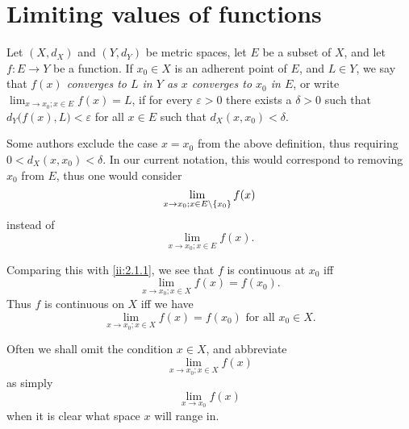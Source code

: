 \section{Limiting values of functions}\label{ii:sec:3.1}

\begin{defn}\label{ii:3.1.1}
  Let \((X, d_X)\) and \((Y, d_Y)\) be metric spaces, let \(E\) be a subset of \(X\), and let \(f : E \to Y\) be a function.
  If \(x_0 \in X\) is an adherent point of \(E\), and \(L \in Y\), we say that \emph{\(f(x)\) converges to \(L\) in \(Y\) as \(x\) converges to \(x_0\) in \(E\)}, or write \(\lim_{x \to x_0 ; x \in E} f(x) = L\), if for every \(\varepsilon > 0\) there exists a \(\delta > 0\) such that \(d_Y\big(f(x), L\big) < \varepsilon\) for all \(x \in E\) such that \(d_X(x, x_0) < \delta\).
\end{defn}

\begin{rmk}\label{ii:3.1.2}
  Some authors exclude the case \(x = x_0\) from the above definition, thus requiring \(0 < d_X(x, x_0) < \delta\).
  In our current notation, this would correspond to removing \(x_0\) from \(E\), thus one would consider
  \[
    \lim_{x \to x_0 ; x \in E \setminus \left\lbrace x_0\right\rbrace} f(x)
  \]
  instead of
  \[
    \lim_{x \to x_0 ; x \in E} f(x).
  \]
\end{rmk}

\begin{note}
  Comparing this with \cref{ii:2.1.1}, we see that \(f\) is continuous at \(x_0\) iff
  \[
    \lim_{x \to x_0 ; x \in X} f(x) = f(x_0).
  \]
  Thus \(f\) is continuous on \(X\) iff we have
  \[
    \lim_{x \to x_0 ; x \in X} f(x) = f(x_0) \text{ for all } x_0 \in X.
  \]
\end{note}

\setcounter{thm}{3}
\begin{rmk}\label{ii:3.1.4}
  Often we shall omit the condition \(x \in X\), and abbreviate
  \[
    \lim_{x \to x_0 ; x \in X} f(x)
  \]
  as simply
  \[
    \lim_{x \to x_0} f(x)
  \]
  when it is clear what space \(x\) will range in.
\end{rmk}

